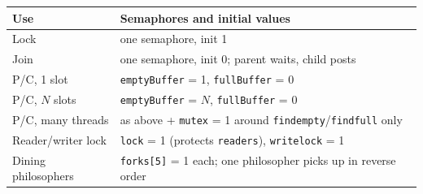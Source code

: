 \documentclass[11pt,a4paper]{article}
\begin{document}
\begin{center}
\renewcommand{\arraystretch}{1.18}
\small
\begin{tabularx}{\textwidth}{@{}lX@{}}
  \toprule
  \textbf{Use} & \textbf{Semaphores and initial values} \\
  \midrule
  Lock & one semaphore, init 1 \\
  Join & one semaphore, init 0; parent waits, child posts \\
  P/C, 1 slot & \texttt{emptyBuffer} = 1, \texttt{fullBuffer} = 0 \\
  P/C, \(N\) slots & \texttt{emptyBuffer} = \(N\), \texttt{fullBuffer} = 0 \\
  P/C, many threads & as above + \texttt{mutex} = 1 around \texttt{findempty}/\texttt{findfull} only \\
  Reader/writer lock & \texttt{lock} = 1 (protects \texttt{readers}), \texttt{writelock} = 1 \\
  Dining philosophers & \texttt{forks[5]} = 1 each; one philosopher picks up in reverse order \\
  \bottomrule
\end{tabularx}
\end{center}
\end{document}
